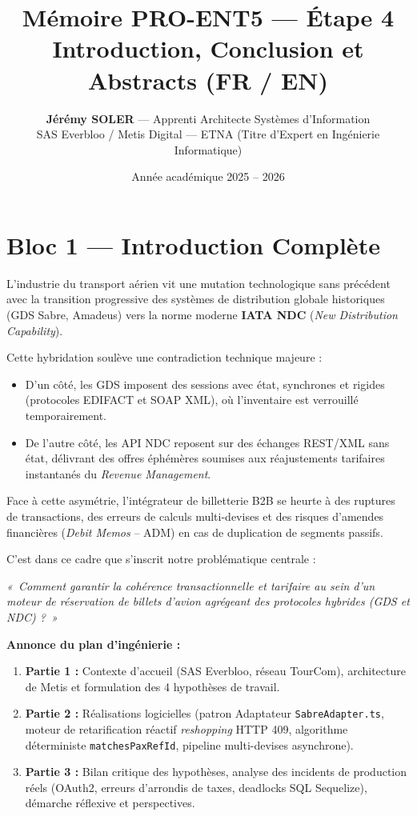 \documentclass[11pt,a4paper]{article}
\title{\vspace{-1cm}\Huge\textbf{\textcolor{NavyBlue}{Mémoire PRO-ENT5 — Étape 4}}\\[6pt]
\Large\textbf{\textcolor{CobaltBlue}{Introduction, Conclusion et Abstracts (FR / EN)}}}
\author{\textbf{Jérémy SOLER} — Apprenti Architecte Systèmes d'Information\\
SAS Everbloo / Metis Digital — ETNA (Titre d'Expert en Ingénierie Informatique)}
\date{Année académique 2025 -- 2026}
\begin{document}
\maketitle

\vspace{0.2cm}

\section*{Bloc 1 — Introduction Complète}
L'industrie du transport aérien vit une mutation technologique sans précédent avec la transition progressive des systèmes de distribution globale historiques (GDS Sabre, Amadeus) vers la norme moderne \textbf{IATA NDC} (\textit{New Distribution Capability}).

Cette hybridation soulève une contradiction technique majeure :
\begin{itemize}[itemsep=2pt]
    \item D'un côté, les GDS imposent des sessions avec état, synchrones et rigides (protocoles EDIFACT et SOAP XML), où l'inventaire est verrouillé temporairement.
    \item De l'autre côté, les API NDC reposent sur des échanges REST/XML sans état, délivrant des offres éphémères soumises aux réajustements tarifaires instantanés du \textit{Revenue Management}.
\end{itemize}

Face à cette asymétrie, l'intégrateur de billetterie B2B se heurte à des ruptures de transactions, des erreurs de calculs multi-devises et des risques d'amendes financières (\textit{Debit Memos} -- ADM) en cas de duplication de segments passifs.

C'est dans ce cadre que s'inscrit notre problématique centrale :
\begin{tcolorbox}[colback=LightGray, colframe=NavyBlue, arc=4pt, boxrule=1.1pt]
\centering\large\itshape\color{NavyBlue}
«~Comment garantir la cohérence transactionnelle et tarifaire au sein d'un moteur de réservation de billets d'avion agrégeant des protocoles hybrides (GDS et NDC) ?~»
\end{tcolorbox}

\noindent\textbf{Annonce du plan d'ingénierie :}
\begin{enumerate}[itemsep=2pt]
    \item \textbf{Partie 1 :} Contexte d'accueil (SAS Everbloo, réseau TourCom), architecture de Metis et formulation des 4 hypothèses de travail.
    \item \textbf{Partie 2 :} Réalisations logicielles (patron Adaptateur \texttt{SabreAdapter.ts}, moteur de retarification réactif \textit{reshopping} HTTP 409, algorithme déterministe \texttt{matchesPaxRefId}, pipeline multi-devises asynchrone).
    \item \textbf{Partie 3 :} Bilan critique des hypothèses, analyse des incidents de production réels (OAuth2, erreurs d'arrondis de taxes, deadlocks SQL Sequelize), démarche réflexive et perspectives.
\end{enumerate}
\end{document}
